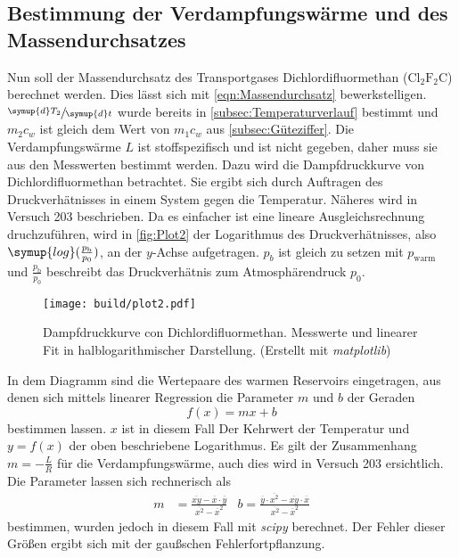 \subsection{Bestimmung der Verdampfungswärme und des Massendurchsatzes}
\label{subsec:Massendurchsatz}
Nun soll der Massendurchsatz des Transportgases Dichlordifluormethan ($\text{Cl}_2\text{F}_2\text{C}$) berechnet werden. Dies lässt sich mit \autoref{eqn:Massendurchsatz} bewerkstelligen. 
$\sfrac{\symup{d}T_2}{\symup{d}t}$ wurde bereits in \autoref{subsec:Temperaturverlauf} bestimmt und $m_2 c_w$ ist gleich dem Wert von $m_1 c_w$ aus \autoref{subsec:Güteziffer}.
Die Verdampfungswärme $L$ ist stoffspezifisch und ist nicht gegeben, daher muss sie aus den Messwerten bestimmt werden. Dazu wird die Dampfdruckkurve von Dichlordifluormethan
betrachtet. Sie ergibt sich durch Auftragen des Druckverhätnisses in einem System gegen die Temperatur. Näheres wird in Versuch 203 \cite{v203} beschrieben. 
Da es einfacher ist eine lineare Ausgleichsrechnung druchzuführen, wird in \autoref{fig:Plot2} der Logarithmus des Druckverhätnisses, also
$\symup{log}(\frac{p_{\text{b}}}{p_0})$, an der $y$-Achse aufgetragen. $p_b$ ist gleich zu setzen mit $p_\text{warm}$ und $\frac{p_{\text{b}}}{p_0}$ beschreibt das Druckverhätnis
zum Atmosphärendruck $p_0$.

\begin{figure}
  \centering
  \caption{Dampfdruckkurve con Dichlordifluormethan. Messwerte und linearer Fit in halblogarithmischer Darstellung. (Erstellt mit \textit{matplotlib}\cite{matplotlib})}
  \label{fig:Plot2}
  \texttt{[image: build/plot2.pdf]}
\end{figure}

In dem Diagramm sind die Wertepaare des warmen Reservoirs eingetragen, aus denen sich mittels linearer Regression die Parameter $m$ und $b$ der Geraden
\begin{equation*}
  f(x) = mx + b
\end{equation*}
bestimmen lassen. $x$ ist in diesem Fall Der Kehrwert der Temperatur und $y = f(x)$ der oben beschriebene Logarithmus. Es gilt der Zusammenhang $m = - \frac{L}{R}$ für 
die Verdampfungswärme, auch dies wird in Versuch 203 \cite{v203} ersichtlich. Die Parameter lassen sich rechnerisch als
\begin{align*}
  m &= \frac{\overline{xy}-\overline{x} \cdot \overline{y}}{\overline{x^2}-\overline{x}^2} & %
  b = \frac{\overline{y} \cdot \overline{x^2}-\overline{xy} \cdot \overline{x}}{\overline{x^2}-\overline{x}^2}
\end{align*}
bestimmen, wurden jedoch in diesem Fall mit \textit{scipy} \cite{scipy} berechnet. Der Fehler dieser Größen ergibt sich mit der gaußschen Fehlerfortpflanzung.

